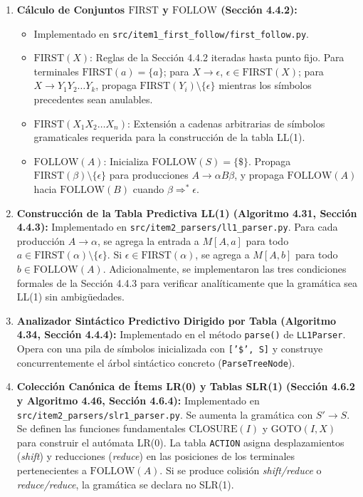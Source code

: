 \documentclass[11pt,a4paper]{article}
\begin{document}
\begin{enumerate}
    \item \textbf{Cálculo de Conjuntos $\text{FIRST}$ y $\text{FOLLOW}$ (Sección 4.4.2):}
    \begin{itemize}
        \item Implementado en \texttt{src/item1\_first\_follow/first\_follow.py}.
        \item $\text{FIRST}(X)$: Reglas de la Sección 4.4.2 iteradas hasta punto fijo. Para terminales $\text{FIRST}(a)=\{a\}$; para $X \rightarrow \epsilon$, $\epsilon \in \text{FIRST}(X)$; para $X \rightarrow Y_1 Y_2 \dots Y_k$, propaga $\text{FIRST}(Y_i) \setminus \{\epsilon\}$ mientras los símbolos precedentes sean anulables.
        \item $\text{FIRST}(X_1 X_2 \dots X_n)$: Extensión a cadenas arbitrarias de símbolos gramaticales requerida para la construcción de la tabla LL(1).
        \item $\text{FOLLOW}(A)$: Inicializa $\text{FOLLOW}(S) = \{\$\}$. Propaga $\text{FIRST}(\beta) \setminus \{\epsilon\}$ para producciones $A \rightarrow \alpha B \beta$, y propaga $\text{FOLLOW}(A)$ hacia $\text{FOLLOW}(B)$ cuando $\beta \Rightarrow^* \epsilon$.
    \end{itemize}

    \item \textbf{Construcción de la Tabla Predictiva LL(1) (Algoritmo 4.31, Sección 4.4.3):}
    Implementado en \texttt{src/item2\_parsers/ll1\_parser.py}. Para cada producción $A \rightarrow \alpha$, se agrega la entrada a $M[A, a]$ para todo $a \in \text{FIRST}(\alpha) \setminus \{\epsilon\}$. Si $\epsilon \in \text{FIRST}(\alpha)$, se agrega a $M[A, b]$ para todo $b \in \text{FOLLOW}(A)$. Adicionalmente, se implementaron las tres condiciones formales de la Sección 4.4.3 para verificar analíticamente que la gramática sea LL(1) sin ambigüedades.

    \item \textbf{Analizador Sintáctico Predictivo Dirigido por Tabla (Algoritmo 4.34, Sección 4.4.4):}
    Implementado en el método \texttt{parse()} de \texttt{LL1Parser}. Opera con una pila de símbolos inicializada con \texttt{['\$', S]} y construye concurrentemente el árbol sintáctico concreto (\texttt{ParseTreeNode}).

    \item \textbf{Colección Canónica de Ítems LR(0) y Tablas SLR(1) (Sección 4.6.2 y Algoritmo 4.46, Sección 4.6.4):}
    Implementado en \texttt{src/item2\_parsers/slr1\_parser.py}. Se aumenta la gramática con $S' \rightarrow S$. Se definen las funciones fundamentales $\text{CLOSURE}(I)$ y $\text{GOTO}(I, X)$ para construir el autómata LR(0). La tabla \texttt{ACTION} asigna desplazamientos (\textit{shift}) y reducciones (\textit{reduce}) en las posiciones de los terminales pertenecientes a $\text{FOLLOW}(A)$. Si se produce colisión \textit{shift/reduce} o \textit{reduce/reduce}, la gramática se declara no SLR(1).


\end{enumerate}
\end{document}
